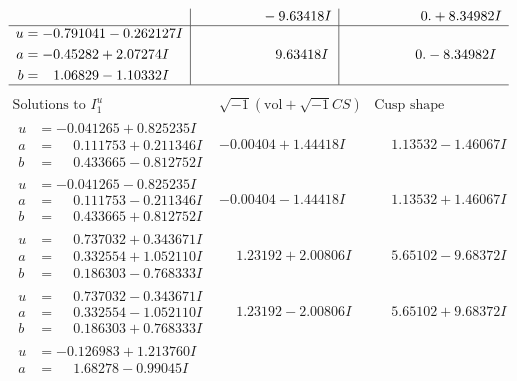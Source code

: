 \documentclass[1p]{elsarticle_modified}
\theoremstyle{definition}
\newcommand{\I}{\sqrt{-1}}
\begin{document}
$$\begin{array}{c|c|c}
 & \phantom{-0.000000 } -9.63418 I & \phantom{-0.000000 -}0. + 8.34982 I \\ \hline\begin{aligned}
u &= -0.791041 - 0.262127 I \\
a &= -0.45282 + 2.07274 I \\
b &= \phantom{-}1.06829 - 1.10332 I\end{aligned}
 & \phantom{-0.000000 -}9.63418 I & \phantom{-0.000000 } 0. - 8.34982 I\\
 \hline 
 \end{array}$$\newpage$$\begin{array}{c|c|c}  
\text{Solutions to }I^u_{1}& \I (\text{vol} + \sqrt{-1}CS) & \text{Cusp shape}\\
 \hline 
\begin{aligned}
u &= -0.041265 + 0.825235 I \\
a &= \phantom{-}0.111753 + 0.211346 I \\
b &= \phantom{-}0.433665 - 0.812752 I\end{aligned}
 & -0.00404 + 1.44418 I & \phantom{-}1.13532 - 1.46067 I \\ \hline\begin{aligned}
u &= -0.041265 - 0.825235 I \\
a &= \phantom{-}0.111753 - 0.211346 I \\
b &= \phantom{-}0.433665 + 0.812752 I\end{aligned}
 & -0.00404 - 1.44418 I & \phantom{-}1.13532 + 1.46067 I \\ \hline\begin{aligned}
u &= \phantom{-}0.737032 + 0.343671 I \\
a &= \phantom{-}0.332554 + 1.052110 I \\
b &= \phantom{-}0.186303 - 0.768333 I\end{aligned}
 & \phantom{-}1.23192 + 2.00806 I & \phantom{-}5.65102 - 9.68372 I \\ \hline\begin{aligned}
u &= \phantom{-}0.737032 - 0.343671 I \\
a &= \phantom{-}0.332554 - 1.052110 I \\
b &= \phantom{-}0.186303 + 0.768333 I\end{aligned}
 & \phantom{-}1.23192 - 2.00806 I & \phantom{-}5.65102 + 9.68372 I \\ \hline\begin{aligned}
u &= -0.126983 + 1.213760 I \\
a &= \phantom{-}1.68278 - 0.99045 I \\

\end{aligned}
\end{array}$$
\end{document}
